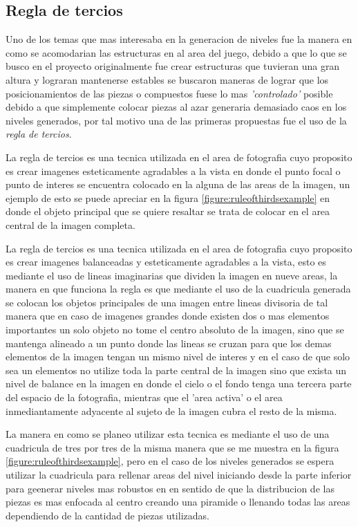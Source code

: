 \subsection{Regla de tercios}
\label{subsection:ruleofthirds}

Uno de los temas que mas interesaba en la generacion de niveles fue la manera en
como se acomodarian las estructuras en al area del juego, debido a que lo que se
busco en el proyecto originalmente fue crear estructuras que tuvieran una gran
altura y lograran mantenerse estables se buscaron maneras de lograr que los
posicionamientos de las piezas o compuestos fuese lo mas \textit{'controlado'}
posible debido a que simplemente colocar piezas al azar generaria demasiado caos
en los niveles generados, por tal motivo una de las primeras propuestas fue el
uso de la \textit{regla de tercios}.

La regla de tercios es una tecnica utilizada en el area de fotografia cuyo
proposito es crear imagenes esteticamente agradables a la vista en donde el
punto focal o punto de interes se encuentra colocado en la alguna de las areas
de la imagen, un ejemplo de esto se puede apreciar en la figura
\ref{figure:ruleofthirdsexample} en donde el objeto principal que se quiere
resaltar se trata de colocar en el area central de la imagen completa.

La regla de tercios es una tecnica utilizada en el area de fotografia cuyo
proposito es crear imagenes balanceadas y esteticamente agradables a la vista,
esto es mediante el uso de lineas imaginarias que dividen la imagen en nueve
areas, la manera en que funciona la regla es que mediante el uso de la
cuadricula generada se colocan los objetos principales de una imagen entre
lineas divisoria de tal manera que en caso de imagenes grandes donde existen dos
o mas elementos importantes un solo objeto no tome el centro absoluto de la
imagen, sino que se mantenga alineado a un punto donde las lineas se cruzan para
que los demas elementos de la imagen tengan un mismo nivel de interes y en el
caso de que solo sea un elementos no utilize toda la parte central de la imagen
sino que exista un nivel de balance en la imagen en donde el cielo o el fondo
tenga una tercera parte del espacio de la fotografia, mientras que el 'area
activa' o el area inmediantamente adyacente al sujeto de la imagen cubra el
resto de la misma.

La manera en como se planeo utilizar esta tecnica es mediante el uso de una
cuadricula de tres por tres de la misma manera que se me muestra en la figura
\ref{figure:ruleofthirdsexample}, pero en el caso de los niveles generados se
espera utilizar la cuadricula para rellenar areas del nivel iniciando desde la
parte inferior para geenerar niveles mas robustos en en sentido de que la
distribucion de las piezas es mas enfocada al centro creando una piramide o
llenando todas las areas dependiendo de la cantidad de piezas utilizadas. 

